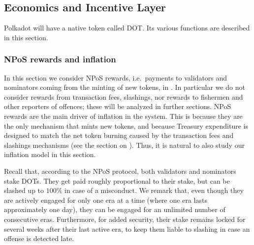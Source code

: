 \subsection{Economics and Incentive Layer}\label{sec:economics}

Polkadot will have a native token called DOT. Its various functions are described in this section.



\subsubsection{NPoS rewards and inflation}

In this section we consider NPoS rewards, i.e.~payments to validators and nominators coming from the minting of new tokens, 
in . In particular we do not consider rewards from transaction fees, slashings, nor rewards to fishermen 
and other reporters of offences; these will be analyzed in further sections. 
NPoS rewards are the main driver of inflation in the system. 
This is because they are the only mechanism that mints new tokens, and because Treasury expenditure is designed to match 
the net token burning caused by the transaction fees and slashings mechanisms (see the section on ). 
Thus, it is natural to also study our inflation model in this section.

Recall that, according to the NPoS protocol, both validators and nominators stake DOTs. 
They get paid roughly proportional to their stake, but can be slashed up to $100\%$ in case of a misconduct. 
We remark that, even though they are actively engaged for only one era at a time (where one era lasts approximately one day), 
they can be engaged for an unlimited number of consecutive eras. 
Furthermore, for added security, their stake remains locked for several weeks after their last active era, 
to keep them liable to slashing in case an offense is detected late.

